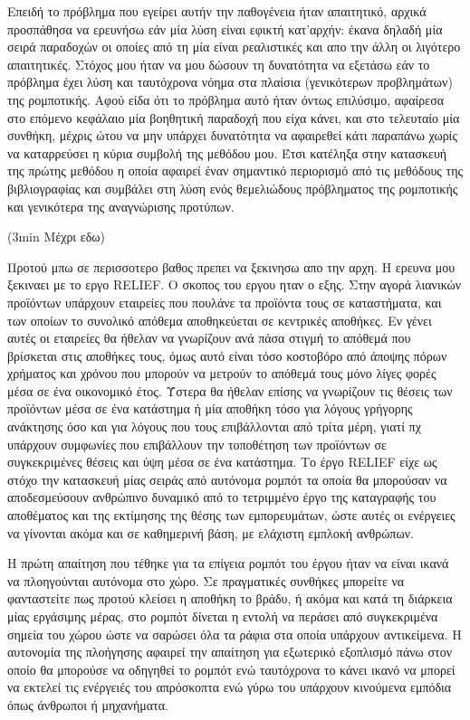 \documentclass[a4paper,10pt]{article}
\begin{document}
Επειδή το πρόβλημα που εγείρει αυτήν την παθογένεια ήταν απαιτητικό, αρχικά
προσπάθησα να ερευνήσω εάν μία λύση είναι εφικτή κατ'αρχήν: έκανα δηλαδή μία
σειρά παραδοχών οι οποίες από τη μία είναι ρεαλιστικές και απο την άλλη οι
λιγότερο απαιτητικές. Στόχος μου ήταν να μου δώσουν τη δυνατότητα να εξετάσω
εάν το πρόβλημα έχει λύση και ταυτόχρονα νόημα στα πλαίσια (γενικότερων
προβλημάτων) της ρομποτικής. Αφού είδα ότι το πρόβλημα αυτό ήταν όντως
επιλύσιμο, αφαίρεσα στο επόμενο κεφάλαιο μία βοηθητική παραδοχή που είχα κάνει,
και στο τελευταίο μία συνθήκη, μέχρις ώτου να μην υπάρχει δυνατότητα να
αφαιρεθεί κάτι παραπάνω χωρίς να καταρρεύσει η κύρια συμβολή της μεθόδου μου.
Έτσι κατέληξα στην κατασκευή της πρώτης μεθόδου η οποία αφαιρεί έναν σημαντικό
περιορισμό από τις μεθόδους της βιβλιογραφίας και συμβάλει στη λύση ενός
θεμελιώδους πρόβληματος της ρομποτικής και γενικότερα της αναγνώρισης προτύπων.


(3min Μέχρι εδω)



Προτού μπω σε περισσοτερο βαθος πρεπει να ξεκινησω απο την αρχη. Η ερευνα μου
ξεκιναει με το εργο RELIEF. Ο σκοπος του εργου ηταν ο εξης. Στην αγορά λιανικών
προϊόντων υπάρχουν εταιρείες που πουλάνε τα προϊόντα τους σε καταστήματα, και
των οποίων το συνολικό απόθεμα αποθηκεύεται σε κεντρικές αποθήκες. Εν γένει
αυτές οι εταιρείες θα ήθελαν να γνωρίζουν ανά πάσα στιγμή το απόθεμά που
βρίσκεται στις αποθήκες τους, όμως αυτό είναι τόσο κοστοβόρο από άποψης πόρων
χρήματος και χρόνου που μπορούν να μετρούν το απόθεμά τους μόνο λίγες φορές
μέσα σε ένα οικονομικό έτος. Ύστερα θα ήθελαν επίσης να γνωρίζουν τις θέσεις
των προϊόντων μέσα σε ένα κατάστημα ή μία αποθήκη τόσο για λόγους γρήγορης
ανάκτησης όσο και για λόγους που τους επιβάλλονται από τρίτα μέρη, γιατί πχ
υπάρχουν συμφωνίες που επιβάλλουν την τοποθέτηση των προϊόντων σε συγκεκριμένες
θέσεις και ύψη μέσα σε ένα κατάστημα. Το έργο RELIEF είχε ως στόχο την
κατασκευή μίας σειράς από αυτόνομα ρομπότ τα οποία θα μπορούσαν να
αποδεσμεύσουν ανθρώπινο δυναμικό από το τετριμμένο έργο της καταγραφής του
αποθέματος και της εκτίμησης της θέσης των εμπορευμάτων, ώστε αυτές οι
ενέργειες να γίνονται ακόμα και σε καθημερινή βάση, με ελάχιστη εμπλοκή
ανθρώπων.

Η πρώτη απαίτηση που τέθηκε για τα επίγεια ρομπότ του έργου ήταν να είναι ικανά
να πλοηγούνται αυτόνομα στο χώρο. Σε πραγματικές συνθήκες μπορείτε να
φανταστείτε πως προτού κλείσει η αποθήκη το βράδυ, ή ακόμα και κατά τη διάρκεια
μίας εργάσιμης μέρας, στο ρομπότ δίνεται η εντολή να περάσει από συγκεκριμένα
σημεία του χώρου ώστε να σαρώσει όλα τα ράφια στα οποία υπάρχουν αντικείμενα.
Η αυτονομία της πλοήγησης αφαιρεί την απαίτηση για εξωτερικό εξοπλισμό πάνω
στον οποίο θα μπορούσε να οδηγηθεί το ρομπότ ενώ ταυτόχρονα το κάνει ικανό να
μπορεί να εκτελεί τις ενέργειές του απρόσκοπτα ενώ γύρω του υπάρχουν κινούμενα
εμπόδια όπως άνθρωποι ή μηχανήματα.
\end{document}
